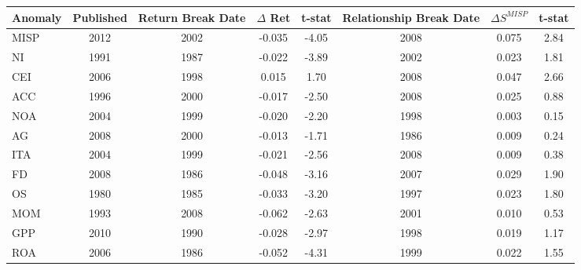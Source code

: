 \begin{tabular}{lccccccc}
\toprule
\multicolumn{1}{c}{Anomaly} & Published & Return Break Date & $\Delta$ Ret & t-stat & Relationship Break Date & $\Delta S^{MISP}$  & t-stat \\
\midrule
MISP  & 2012  & 2002  & -0.035 & -4.05 & 2008  & 0.075 & 2.84 \\
NI    & 1991  & 1987  & -0.022 & -3.89 & 2002  & 0.023 & 1.81 \\
CEI   & 2006  & 1998  & 0.015 & 1.70  & 2008  & 0.047 & 2.66 \\
ACC   & 1996  & 2000  & -0.017 & -2.50 & 2008  & 0.025 & 0.88 \\
NOA   & 2004  & 1999  & -0.020 & -2.20 & 1998  & 0.003 & 0.15 \\
AG    & 2008  & 2000  & -0.013 & -1.71 & 1986  & 0.009 & 0.24 \\
ITA   & 2004  & 1999  & -0.021 & -2.56 & 2008  & 0.009 & 0.38 \\
FD    & 2008  & 1986  & -0.048 & -3.16 & 2007  & 0.029 & 1.90 \\
OS    & 1980  & 1985  & -0.033 & -3.20 & 1997  & 0.023 & 1.80 \\
MOM   & 1993  & 2008  & -0.062 & -2.63 & 2001  & 0.010 & 0.53 \\
GPP   & 2010  & 1990  & -0.028 & -2.97 & 1998  & 0.019 & 1.17 \\
ROA   & 2006  & 1986  & -0.052 & -4.31 & 1999  & 0.022 & 1.55 \\
\bottomrule
\end{tabular}%
